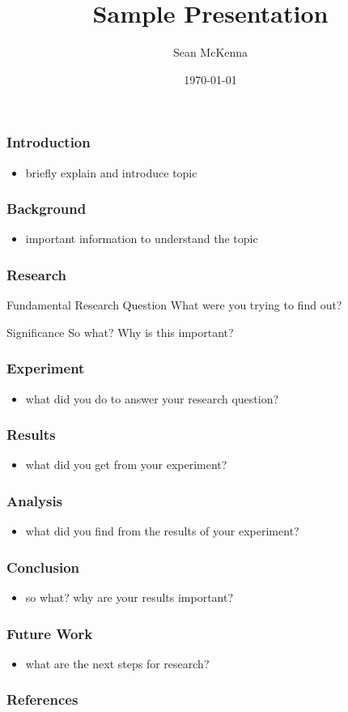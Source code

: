 \documentclass{beamer}
\title{Sample Presentation}
\author{Sean McKenna}
\institute[University of Utah]{ University of Utah \\ \medskip {\emph{mckennapsean@gmail.com}} }
\date{\today}
\begin{document}
\begin{frame}
  \titlepage
\end{frame}

\begin{frame}
  \frametitle{Introduction}
  \begin{itemize}
    \item briefly explain and introduce topic
  \end{itemize}
\end{frame}

\begin{frame}
  \frametitle{Background}
  \begin{itemize}
    \item important information to understand the topic
  \end{itemize}
\end{frame}

\begin{frame}
  \frametitle{Research}
  \begin{block}{Fundamental Research Question}
    What were you trying to find out?
  \end{block}
  \begin{block}{Significance}
    So what? Why is this important?
  \end{block}
\end{frame}

\begin{frame}
  \frametitle{Experiment}
  \begin{itemize}
    \item what did you do to answer your research question?
  \end{itemize}
\end{frame}

\begin{frame}
  \frametitle{Results}
  \begin{itemize}
    \item what did you get from your experiment?
  \end{itemize}
\end{frame}

\begin{frame}
  \frametitle{Analysis}
  \begin{itemize}
    \item what did you find from the results of your experiment?
  \end{itemize}
\end{frame}

\begin{frame}
  \frametitle{Conclusion}
  \begin{itemize}
    \item so what? why are your results important?
  \end{itemize}
\end{frame}

\begin{frame}
  \frametitle{Future Work}
  \begin{itemize}
    \item what are the next steps for research?
  \end{itemize}
\end{frame}

\begin{frame}
  \frametitle{References}
  
\end{frame}
\end{document}
